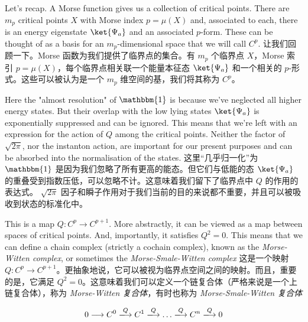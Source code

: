 \documentclass{ctexart}
\begin{document}
\begin{paracol}{2}
Let’s recap. A Morse function gives us a collection of critical points. There are $m_p$ critical points $X$ with Morse index $p = \mu(X)$ and, associated to each, there is an energy eigenstate $\ket{\Psi_a}$ and an associated $p$-form. These can be thought of as a basis for an $m_p$-dimensional space that we will call $C^p$.
\switchcolumn
让我们回顾一下。Morse 函数为我们提供了临界点的集合。有 $m_p$ 个临界点 $X$，Morse 索引 $p = \mu(X)$，每个临界点相关联一个能量本征态 $\ket{\Psi_a}$ 和一个相关的 $p$-形式。这些可以被认为是一个 $m_p$ 维空间的基，我们将其称为 $C^p$。
\switchcolumn*

Here the "almost resolution" of $\mathbbm{1}$ is because we've neglected all higher energy states. But their overlap with the low lying states $\ket{\Psi_a}$ is exponentially suppressed and can be ignored. This means that we're left with an expression for the action of $Q$ among the critical points. Neither the factor of $\sqrt{2 \pi}$, nor the instanton action, are important for our present purposes and can be absorbed into the normalisation of the states.
\switchcolumn
这里“几乎归一化”为 $\mathbbm{1}$ 是因为我们忽略了所有更高的能态。但它们与低能的态 $\ket{\Psi_a}$ 的重叠受到指数压低，可以忽略不计。这意味着我们留下了临界点中 $Q$ 的作用的表达式。 $\sqrt{2 \pi}$ 因子和瞬子作用对于我们当前的目的来说都不重要，并且可以被吸收到状态的标准化中。
\switchcolumn*

This is a map $Q: C^p \to C^{p + 1}$. More abstractly, it can be viewed as a map between spaces of critical points. And, importantly, it satisfies $Q^2 = 0$. This means that we can define a chain complex (strictly a cochain complex), known as the \textit{Morse-Witten complex}, or sometimes the \textit{Morse-Smale-Witten complex}
\switchcolumn
这是一个映射 $Q: C^p \to C^{p + 1}$。更抽象地说，它可以被视为临界点空间之间的映射。而且，重要的是，它满足 $Q^2 = 0$。这意味着我们可以定义一个链复合体（严格来说是一个上链复合体），称为 \textit{Morse-Witten 复合体}，有时也称为 \textit{Morse-Smale-Witten 复合体}
\end{paracol}

\[ 0 \longrightarrow C^0 \xlongrightarrow{Q} C^1 \xlongrightarrow{Q} \dots \xlongrightarrow{Q} C^n \xlongrightarrow{Q} 0 \]
\end{document}
